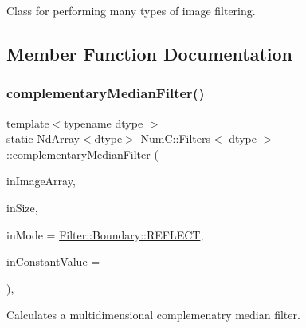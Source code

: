 Class for performing many types of image filtering. 

\subsection{Member Function Documentation}
\mbox{\label{class_num_c_1_1_filters_ac64c322e09321ba9903d4463174c1f80}} 
\subsubsection{\texorpdfstring{complementary\+Median\+Filter()}{complementaryMedianFilter()}}
{\footnotesize\ttfamily template$<$typename dtype $>$ \\
static \mbox{\hyperlink{class_num_c_1_1_nd_array}{Nd\+Array}}$<$dtype$>$ \mbox{\hyperlink{class_num_c_1_1_filters}{Num\+C\+::\+Filters}}$<$ dtype $>$\+::complementary\+Median\+Filter (\begin{DoxyParamCaption}\item[{const \mbox{\hyperlink{class_num_c_1_1_nd_array}{Nd\+Array}}$<$ dtype $>$ \&}]{in\+Image\+Array,  }\item[{\mbox{\hyperlink{namespace_num_c_ae685802ca6d3035f2b400b081e3953fa}{uint32}}}]{in\+Size,  }\item[{\mbox{\hyperlink{struct_num_c_1_1_filter_1_1_boundary_a20ccfbf059139a99eda623c1550a27e3}{Filter\+::\+Boundary\+::\+Mode}}}]{in\+Mode = {\ttfamily \mbox{\hyperlink{struct_num_c_1_1_filter_1_1_boundary_a20ccfbf059139a99eda623c1550a27e3a5571d98046aa858b5c79dce8c4c16c04}{Filter\+::\+Boundary\+::\+R\+E\+F\+L\+E\+CT}}},  }\item[{dtype}]{in\+Constant\+Value = {} }\end{DoxyParamCaption})\hspace{0.3cm}{\ttfamily [inline]}, {\ttfamily [static]}}

Calculates a multidimensional complemenatry median filter.


